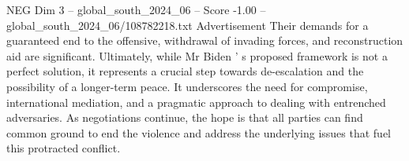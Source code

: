 \begin{textsample}{NEG Dim 3 – global\_south\_2024\_06 – Score -1.00 – global\_south\_2024\_06/108782218.txt}
Advertisement Their demands for a guaranteed end to the offensive, withdrawal of invading forces, and reconstruction aid are significant.
Ultimately, while Mr Biden ' s proposed framework is not a perfect solution, it represents a crucial step towards de-escalation and the possibility of a longer-term peace.
It underscores the need for compromise, international mediation, and a pragmatic approach to dealing with entrenched adversaries.
As negotiations continue, the hope is that all parties can find common ground to end the violence and address the underlying issues that fuel this protracted conflict.

\end{textsample}
